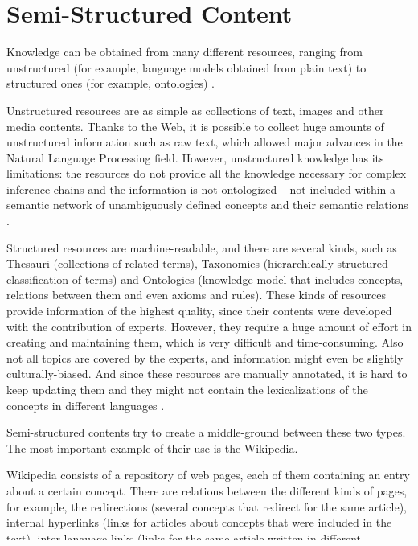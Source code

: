 \section{Semi-Structured Content}
Knowledge can be obtained from many different resources, ranging from unstructured (for example, language models obtained from plain text) to structured ones (for example, ontologies) \cite{hovy2013collaboratively}.

Unstructured resources are as simple as collections of text, images and other media contents. Thanks to the Web, it is possible to collect huge amounts of unstructured information such as raw text, which allowed major advances in the Natural Language Processing field. However, unstructured knowledge has its limitations: the resources do not provide all the knowledge necessary for complex inference chains \cite{domingos2007toward} and the information is not ontologized – not included within a semantic network of unambiguously defined concepts and their semantic relations \cite{hovy2013collaboratively}.

Structured resources are machine-readable, and there are several kinds, such as Thesauri (collections of related terms), Taxonomies (hierarchically structured classification of terms) and Ontologies (knowledge model that includes concepts, relations between them and even axioms and rules). These kinds of resources provide information of the highest quality, since their contents were developed with the contribution of experts. However, they require a huge amount of effort in creating and maintaining them, which is very difficult and time-consuming. Also not all topics are covered by the experts, and information might even be slightly culturally-biased. And since these resources are manually annotated, it is hard to keep updating them and they might not contain the lexicalizations of the concepts in different languages \cite{hovy2013collaboratively}.

Semi-structured contents try to create a middle-ground between these two types. The most important example of their use is the Wikipedia. 

Wikipedia consists of a repository of web pages, each of them containing an entry about a certain concept. There are relations between the different kinds of pages, for example, the redirections (several concepts that redirect for the same article), internal hyperlinks (links for articles about concepts that were included in the text), inter-language links (links for the same article written in different languages) and category pages (used to classify entries). Pages can also contain info-boxes (tables summarizing the most important information).

